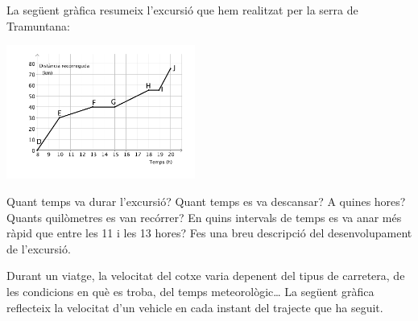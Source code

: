 \begin{mylist}
 \exer La següent gràfica resumeix l'excursió que hem realitzat per la serra de Tramuntana:
		
	\begin{minipage}{0.4\textwidth}
		\centering
		\includegraphics[width=6.2cm]{img-08/graf45}
	\end{minipage}
	\begin{minipage}{0.53\textwidth}
	\begin{tasks}
		\task Quant temps va durar l'excursió?
		\task  Quant temps es va descansar? A quines hores?
		\task  Quants quilòmetres es van recórrer?
		\task  En quins intervals de temps es va anar més ràpid que entre les 11 i les 13 hores?
		\task  Fes una breu descripció del desenvolupament de l'excursió.
	\end{tasks}
	
\end{minipage}


\exer  Durant un viatge, la velocitat del cotxe varia depenent del tipus de carretera, de les condicions en què es troba, del temps meteorològic{\dots} La següent gràfica reflecteix la velocitat d'un vehicle en cada instant del trajecte que ha seguit.
 

\end{mylist}
